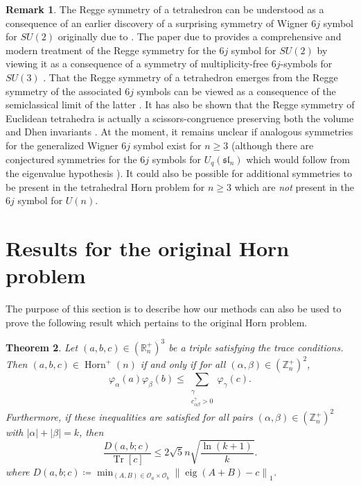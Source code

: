 \documentclass[notitlepage, 11pt, letterpaper]{amsart}
\theoremstyle{plain}
\newtheorem{thm}{Theorem}%
\theoremstyle{definition}
\newtheorem{rem}[thm]{Remark}%
\DeclareMathOperator{\Tr}{Tr}
\DeclareMathOperator{\Horn}{Horn}
\DeclareMathOperator{\eig}{eig}
\newcommand{\orbit}{\mathcal O}
\newcommand{\polyk}[1]{(k\!+\!1)^{#1}}
\newcommand{\norm}[1]{\left\lVert#1\right\rVert}
\newcommand{\undomweightsp}[1]{\mathbb Z^{+}_{#1}}
\newcommand{\eigsp}[1]{\mathbb R^{+}_{#1}}
\newcommand{\vp}{\varphi} %
\newcommand{\ea}{a}
\newcommand{\eb}{b}
\newcommand{\ec}{c}
\newcommand{\tec}{\Tr[\ec]}
\newcommand{\ya}{\alpha}
\newcommand{\yb}{\beta}
\newcommand{\yc}{\gamma}
\newcommand{\sya}{|\ya|}
\newcommand{\syb}{|\yb|}
\begin{document}
\begin{rem}
    The Regge symmetry of a tetrahedron can be understood as a consequence of an earlier discovery of a surprising symmetry of Wigner $6j$ symbol for $SU(2)$ originally due to \citeauthor{regge1959symmetry} \cite{regge1959symmetry}.
    The paper due to \citeauthor{boalch2007regge} provides a comprehensive and modern treatment of the Regge symmetry for the $6j$ symbol for $SU(2)$ by viewing it as a consequence of a symmetry of multiplicity-free $6j$-symbols for $SU(3)$ \cite{boalch2007regge}.
    That the Regge symmetry of a tetrahedron emerges from the Regge symmetry of the associated $6j$ symbols can be viewed as a consequence of the semiclassical limit of the latter \cite{ponzano1968semiclassical,roberts1999classical}.
    It has also be shown that the Regge symmetry of Euclidean tetrahedra is actually a scissors-congruence preserving both the volume and Dhen invariants \cite{akopyan2019regge}.
    At the moment, it remains unclear if analogous symmetries for the generalized Wigner $6j$ symbol exist for $n \geq 3$ (although there are conjectured symmetries for the $6j$ symbols for $U_q(\mathfrak{sl}_n)$ which would follow from the eigenvalue hypothesis \cite{morozov2018new,lanina2023tug}).
    It could also be possible for additional symmetries to be present in the tetrahedral Horn problem for $n \geq 3$ which are \textit{not} present in the $6j$ symbol for $U(n)$.
\end{rem}


\section{Results for the original Horn problem}
\label{sec:new_ineq_horn_orig}

The purpose of this section is to describe how our methods can also be used to prove the following result which pertains to the original Horn problem.

\begin{thm}
    \label{thm:tri_iff}
    Let $(\ea,\eb,\ec) \in (\eigsp{n})^3$ be a triple satisfying the trace conditions.
    Then $(\ea,\eb,\ec) \in \Horn^{+}(n)$ if and only if for all $(\ya,\yb) \in (\undomweightsp{n})^2$,
    \begin{equation}
        \label{eq:tri_iff}
        \vp_{\ya}(\ea)\vp_{\yb}(\eb)
        \leq \sum_{\substack{\yc\\c^{\yc}_{\ya\yb} > 0}} \vp_{\yc}(\ec).
    \end{equation}
    Furthermore, if these inequalities are satisfied for all pairs $(\ya,\yb) \in (\undomweightsp{n})^2$ with $\sya + \syb = k$, then
    \begin{equation}
        \label{eq:tri_dist_bound}
        \frac{D(\ea,\eb;\ec)}{\tec} \leq 2 \sqrt{5} n \sqrt{\frac{\ln \polyk{}}{k}}.
    \end{equation}
    where $D(\ea,\eb;\ec)\coloneqq \min_{(A,B) \in \orbit_\ea \times \orbit_\eb} \norm{\eig(A+B)-\ec}_{1}$.
\end{thm}
\end{document}
